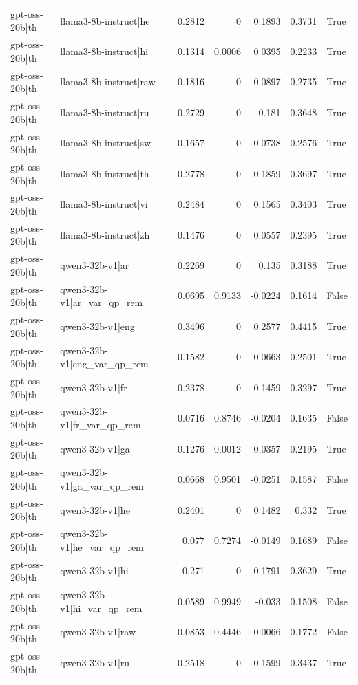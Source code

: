 \begin{table}
\begin{tabular}{l l r r r r l}
gpt-oss-20b|th & llama3-8b-instruct|he & 0.2812 & 0 & 0.1893 & 0.3731 & True \\
gpt-oss-20b|th & llama3-8b-instruct|hi & 0.1314 & 0.0006 & 0.0395 & 0.2233 & True \\
gpt-oss-20b|th & llama3-8b-instruct|raw & 0.1816 & 0 & 0.0897 & 0.2735 & True \\
gpt-oss-20b|th & llama3-8b-instruct|ru & 0.2729 & 0 & 0.181 & 0.3648 & True \\
gpt-oss-20b|th & llama3-8b-instruct|sw & 0.1657 & 0 & 0.0738 & 0.2576 & True \\
gpt-oss-20b|th & llama3-8b-instruct|th & 0.2778 & 0 & 0.1859 & 0.3697 & True \\
gpt-oss-20b|th & llama3-8b-instruct|vi & 0.2484 & 0 & 0.1565 & 0.3403 & True \\
gpt-oss-20b|th & llama3-8b-instruct|zh & 0.1476 & 0 & 0.0557 & 0.2395 & True \\
gpt-oss-20b|th & qwen3-32b-v1|ar & 0.2269 & 0 & 0.135 & 0.3188 & True \\
gpt-oss-20b|th & qwen3-32b-v1|ar_var_qp_rem & 0.0695 & 0.9133 & -0.0224 & 0.1614 & False \\
gpt-oss-20b|th & qwen3-32b-v1|eng & 0.3496 & 0 & 0.2577 & 0.4415 & True \\
gpt-oss-20b|th & qwen3-32b-v1|eng_var_qp_rem & 0.1582 & 0 & 0.0663 & 0.2501 & True \\
gpt-oss-20b|th & qwen3-32b-v1|fr & 0.2378 & 0 & 0.1459 & 0.3297 & True \\
gpt-oss-20b|th & qwen3-32b-v1|fr_var_qp_rem & 0.0716 & 0.8746 & -0.0204 & 0.1635 & False \\
gpt-oss-20b|th & qwen3-32b-v1|ga & 0.1276 & 0.0012 & 0.0357 & 0.2195 & True \\
gpt-oss-20b|th & qwen3-32b-v1|ga_var_qp_rem & 0.0668 & 0.9501 & -0.0251 & 0.1587 & False \\
gpt-oss-20b|th & qwen3-32b-v1|he & 0.2401 & 0 & 0.1482 & 0.332 & True \\
gpt-oss-20b|th & qwen3-32b-v1|he_var_qp_rem & 0.077 & 0.7274 & -0.0149 & 0.1689 & False \\
gpt-oss-20b|th & qwen3-32b-v1|hi & 0.271 & 0 & 0.1791 & 0.3629 & True \\
gpt-oss-20b|th & qwen3-32b-v1|hi_var_qp_rem & 0.0589 & 0.9949 & -0.033 & 0.1508 & False \\
gpt-oss-20b|th & qwen3-32b-v1|raw & 0.0853 & 0.4446 & -0.0066 & 0.1772 & False \\
gpt-oss-20b|th & qwen3-32b-v1|ru & 0.2518 & 0 & 0.1599 & 0.3437 & True \\

\end{tabular}
\end{table}
